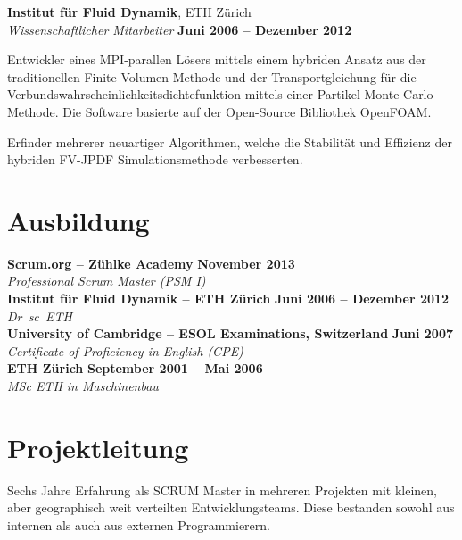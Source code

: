 \documentclass[line,11pt,a4paper]{../resume}
\begin{document}
\begin{resume}
\textbf{Institut für Fluid Dynamik}, ETH Zürich\\\vspace{1mm}%
\textsl{Wissenschaftlicher Mitarbeiter} \hfill \textbf{Juni 2006 -- Dezember 2012}\\
\vspace{-4mm}%
\begin{list2}
  \item Entwickler eines MPI-parallen Lösers mittels einem hybriden Ansatz aus
    der traditionellen Finite-Volumen-Methode und der Transportgleichung für
    die Verbundswahrscheinlichkeitsdichtefunktion mittels einer
    Partikel-Monte-Carlo Methode. Die Software basierte auf der Open-Source
    Bibliothek OpenFOAM.

  \item Erfinder mehrerer neuartiger Algorithmen, welche die Stabilität und
    Effizienz der hybriden FV-JPDF Simulationsmethode verbesserten.
\end{list2}

\pagebreak
\section{\mysidestyle Ausbildung}\vspace{2mm}

\textbf{Scrum.org -- Zühlke Academy} \hfill \textbf{November 2013}\\
\vspace{1mm}%
\textsl{Professional Scrum Master (PSM I)}\\
\vspace{-1mm}%
%
\textbf{Institut für Fluid Dynamik -- ETH Zürich} \hfill \textbf{Juni 2006 -- Dezember 2012}\\
\vspace{1mm}%
\textsl{Dr\ sc\ ETH}\\
\vspace{-1mm}%
%
\textbf{University of Cambridge -- ESOL Examinations, Switzerland} \hfill \textbf{Juni 2007}\\
\vspace{1mm}%
\textsl{Certificate of Proficiency in English (CPE)}\\
\vspace{-1mm}%
%
\textbf{ETH Zürich} \hfill \textbf{September 2001 -- Mai 2006}\\
\vspace{1mm}%
\textsl{MSc ETH in Maschinenbau}

\section{\mysidestyle Projektleitung}\vspace{6mm}
\begin{list2}
  \item Sechs Jahre Erfahrung als SCRUM Master in mehreren Projekten mit
    kleinen, aber geographisch weit verteilten Entwicklungsteams. Diese
    bestanden sowohl aus internen als auch aus externen Programmierern.


\end{list2}
\end{resume}
\end{document}
